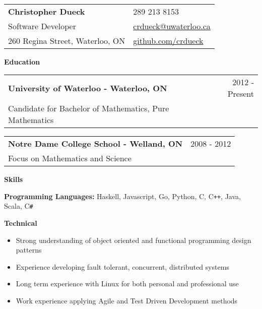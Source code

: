 \documentclass[10pt]{article}
\makeatletter
\newcommand{\resheader}[6]{\
\begin{tabular*}{7in}{l@{\extracolsep{\fill}}l}
    \textbf{\huge #1} & #2
    \vspace{4pt} \\
    {\large #3} & #4
    \vspace{4pt} \\
    {\large #5} & #6
\end{tabular*}\vspace{4pt}}
\newcommand{\resheading}[1]{{\large \colorbox{headercol}{\begin{minipage}{\textwidth}{\textbf{#1 \vphantom{p\^{E}}}}\end{minipage}}}}
\newcommand{\ressubheading}[3]{\item
\begin{tabular*}{7in}{l@{\extracolsep{\fill}}r}
    \textbf{#1} & #2 \\ #3
\end{tabular*}\vspace{-4pt}}
\newcommand{\resitem}[2]{\item{\textbf{#1} #2}}
\newcommand{\phone}{{\Large\faPhone} {\large 289 213 8153}}
\newcommand{\email}{{\Large\faEnvelope} {\large \href{mailto:crdueck@uwaterloo.ca}{crdueck@uwaterloo.ca}}}
\newcommand{\github}{{\Large\faGithub} {\large \href{https://github.com/crdueck}{github.com/crdueck}}}
\makeatother
\begin{document}
\resheader
    {Christopher Dueck}                    \phone
    {Software Developer}                   \email
    {260 Regina Street, Waterloo, ON}      \github

\resheading{Education}
\begin{description}
    \ressubheading{University of Waterloo - Waterloo, ON} {2012 - Present}
    {Candidate for Bachelor of Mathematics, Pure Mathematics}
    \ressubheading{Notre Dame College School - Welland, ON} {2008 - 2012}
    {Focus on Mathematics and Science}
\end{description}

\resheading{Skills}
\begin{description}
    \resitem{Programming Languages:} {Haskell, Javascript, Go, Python, C, C\texttt{++}, Java, Scala, C\texttt{\#}}
    \resitem{Technical}{\vspace{-4pt}
    \begin{itemize}
            \item{Strong understanding of object oriented and functional programming design patterns}
            \item{Experience developing fault tolerant, concurrent, distributed systems}
            \item{Long term experience with Linux for both personal and professional use}
            \item{Work experience applying Agile and Test Driven Development methods}
    \end{itemize}}
\end{description}
\end{document}
